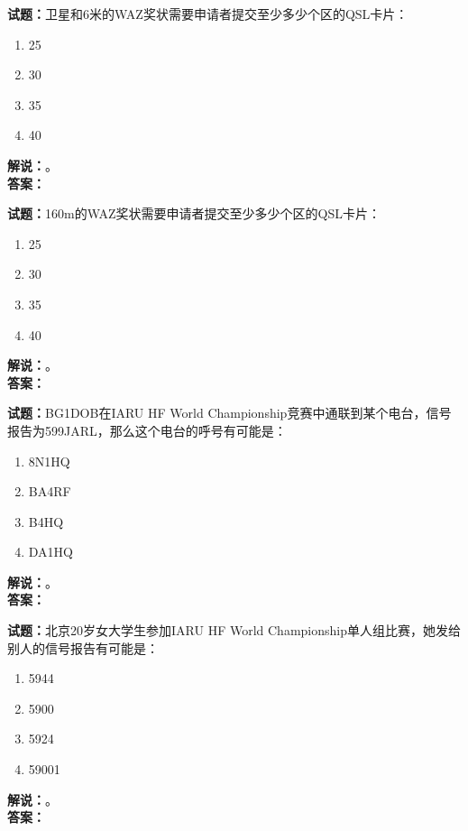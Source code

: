 \documentclass{ctexbook}
\begin{document}
\bigskip




\noindent\textbf{试题：}卫星和6米的WAZ奖状需要申请者提交至少多少个区的QSL卡片：
\begin{enumerate}[leftmargin=3em]
\item 25
\item 30
\item 35
\item 40
\end{enumerate}
\noindent\textbf{解说：}\textbf{}。\\\noindent\textbf{答案：}

\bigskip




\noindent\textbf{试题：}160m的WAZ奖状需要申请者提交至少多少个区的QSL卡片：
\begin{enumerate}[leftmargin=3em]
\item 25
\item 30
\item 35
\item 40
\end{enumerate}
\noindent\textbf{解说：}\textbf{}。\\\noindent\textbf{答案：}

\bigskip




\noindent\textbf{试题：}BG1DOB在IARU HF World Championship竞赛中通联到某个电台，信号报告为599JARL，那么这个电台的呼号有可能是：
\begin{enumerate}[leftmargin=3em]
\item 8N1HQ
\item BA4RF
\item B4HQ
\item DA1HQ
\end{enumerate}
\noindent\textbf{解说：}\textbf{}。\\\noindent\textbf{答案：}

\bigskip




\noindent\textbf{试题：}北京20岁女大学生参加IARU HF World Championship单人组比赛，她发给别人的信号报告有可能是：
\begin{enumerate}[leftmargin=3em]
\item 5944
\item 5900
\item 5924
\item 59001
\end{enumerate}
\noindent\textbf{解说：}\textbf{}。\\\noindent\textbf{答案：}
\end{document}
